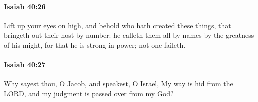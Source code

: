 		\paragraph{Isaiah 40:26} %
			\label{ISAIAH-40-26}

			Lift up your eyes on high, and behold who hath created these things, that bringeth out their host by number: he calleth them all by names by the greatness of his might, for that he is strong in power; not one faileth.


		\paragraph{Isaiah 40:27} %
			\label{ISAIAH-40-27}

			Why sayest thou, O Jacob, and speakest, O Israel, My way is hid from the LORD, and my judgment is passed over from my God?


